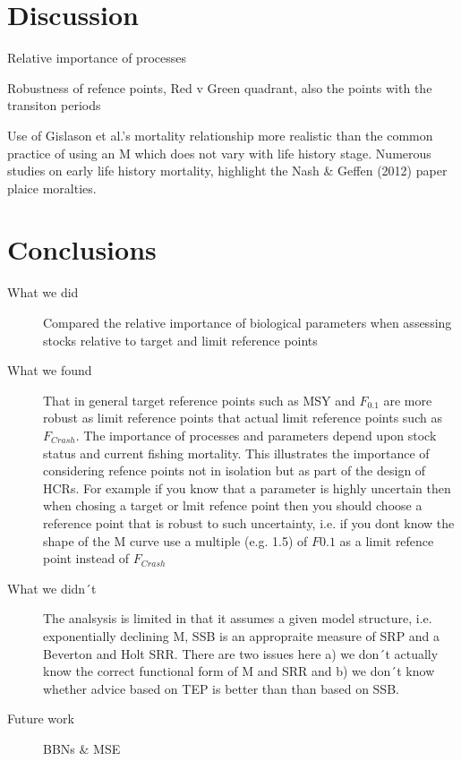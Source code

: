 \documentclass[10pt]{article}
\begin{document}
\section*{Discussion}


\begin{description}
 \item Relative importance of processes
 \item Robustness of refence points, Red v Green quadrant, also the points with the transiton periods
 \item Use of Gislason et al.'s mortality relationship more realistic than the common practice of using an M which does not vary with life history stage. 
Numerous studies on early life history mortality, highlight the Nash \& Geffen (2012) paper plaice moralties. 
\end{description}
    
\section{Conclusions}\label{Conclusions}

\begin{description}
 \item[What we did] Compared the relative importance of biological parameters when assessing stocks relative to target and limit reference points
 \item[What we found] That in general target reference points such as MSY and $F_{0.1}$ are more robust as limit reference points that actual limit reference points
                      such as $F_{Crash}$. The importance of processes and parameters depend upon stock status and current fishing mortality. 
                      This illustrates the importance of considering refence points not in isolation but as part of the design of HCRs. For example 
                      if you know that a parameter is highly uncertain then when chosing a target or lmit refence point then you should choose a 
                      reference point that is robust to such uncertainty, i.e. if you dont know the shape of the M curve use a multiple (e.g. 1.5) of $F0.1$ 
                      as a limit refence point instead of $F_{Crash}$ 
 \item[What we didn´t] The analsysis is limited in that it assumes a given model structure, i.e. exponentially declining M, SSB is an appropraite measure of SRP and
                       a Beverton and Holt SRR. There are two issues here a) we don´t actually know the correct functional form of M and SRR and b) we don´t
                       know whether advice based on TEP is better than than based on SSB.                         
 \item[Future work] BBNs \& MSE
\end{description}
\end{document}
